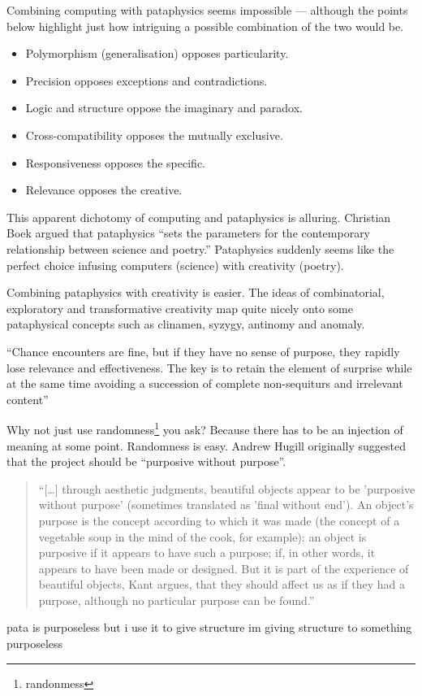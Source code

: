 Combining computing with pataphysics seems impossible --- although the points below highlight just how intriguing a possible combination of the two would be.

\begin{itemize}
  \item Polymorphism (generalisation) opposes particularity.
  \item Precision opposes exceptions and contradictions.
  \item Logic and structure oppose the imaginary and paradox.
  \item Cross-compatibility opposes the mutually exclusive.
  \item Responsiveness opposes the specific.
  \item Relevance opposes the creative.
\end{itemize}

This apparent dichotomy of computing and pataphysics is alluring. Christian Boek argued that pataphysics ``sets the parameters for the contemporary relationship between science and poetry.'' \autocite{Boek2002} Pataphysics suddenly seems like the perfect choice infusing computers (science) with creativity (poetry).

Combining pataphysics with creativity is easier. The ideas of  combinatorial, exploratory and transformative creativity map quite nicely onto some pataphysical concepts such as clinamen, syzygy, antinomy and anomaly.


\begin{fcom}

``Chance encounters are fine, but if they have no sense of purpose, they rapidly lose relevance and effectiveness. The key is to retain the element of surprise while at the same time avoiding a succession of complete non-sequiturs and irrelevant content'' \autocite{Hendler2011}


Why not just use randomness\footnote{randonmess} you ask? Because there has to be an injection of meaning at some point. Randomness is easy. Andrew Hugill originally suggested that the project should be ``purposive without purpose''.

\begin{quotation}
  ``[\ldots] through aesthetic judgments, beautiful objects appear to be 'purposive without purpose' (sometimes translated as 'final without end'). An object's purpose is the concept according to which it was made (the concept of a vegetable soup in the mind of the cook, for example); an object is purposive if it appears to have such a purpose; if, in other words, it appears to have been made or designed. But it is part of the experience of beautiful objects, Kant argues, that they should affect us as if they had a purpose, although no particular purpose can be found.'' 
\end{quotation}

pata is purposeless but i use it to give structure
im giving structure to something purposeless
\end{fcom}

